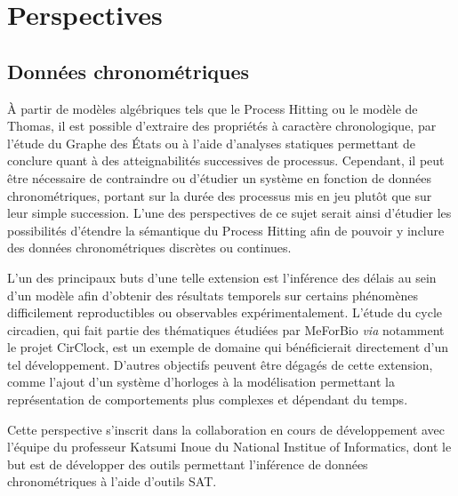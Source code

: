\chapter{Perspectives}




\section{Données chronométriques}
À partir de modèles algébriques tels que le Process Hitting ou le modèle de Thomas, il est possible d'extraire des propriétés à caractère chronologique,
par l'étude du Graphe des États ou à l'aide d'analyses statiques permettant de conclure quant à des atteignabilités successives de processus.
Cependant, il peut être nécessaire de contraindre ou d'étudier un système en fonction de données chronométriques, portant sur la durée des processus mis en jeu plutôt que sur leur simple succession.
L'une des perspectives de ce sujet serait ainsi d'étudier les possibilités d'étendre la sémantique du Process Hitting afin de pouvoir y inclure des données chronométriques discrètes ou continues.

L'un des principaux buts d'une telle extension est l'inférence des délais au sein d'un modèle afin d'obtenir des résultats temporels sur certains phénomènes difficilement reproductibles ou observables expérimentalement.
L'étude du cycle circadien, qui fait partie des thématiques étudiées par MeForBio \textit{via} notamment le projet CirClock, est un exemple de domaine qui bénéficierait directement d'un tel développement.
D'autres objectifs peuvent être dégagés de cette extension, comme l'ajout d'un système d'horloges à la modélisation permettant la représentation de comportements plus complexes et dépendant du temps.

Cette perspective s'inscrit dans la collaboration en cours de développement avec l'équipe du professeur Katsumi Inoue du National Institue of Informatics,
dont le but est de développer des outils permettant l'inférence de données chronométriques à l'aide d'outils SAT.

